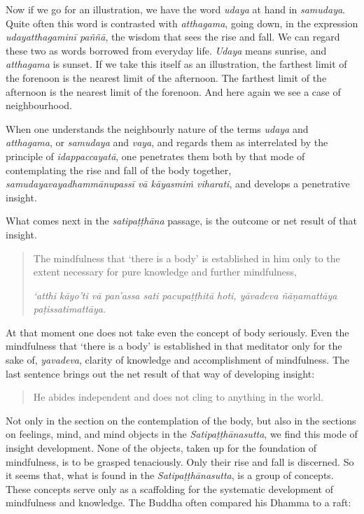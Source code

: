 Now if we go for an illustration, we have the word \emph{udaya} at hand in \emph{samudaya}. Quite often this word is contrasted with \emph{atthagama}, going down, in the expression \emph{udayatthagaminī paññā}, the wisdom that sees the rise and fall. We can regard these two as words borrowed from everyday life. \emph{Udaya} means sunrise, and \emph{atthagama} is sunset. If we take this itself as an illustration, the farthest limit of the forenoon is the nearest limit of the afternoon. The farthest limit of the afternoon is the nearest limit of the forenoon. And here again we see a case of neighbourhood.

When one understands the neighbourly nature of the terms \emph{udaya} and \emph{atthagama}, or \emph{samudaya} and \emph{vaya}, and regards them as interrelated by the principle of \emph{idappaccayatā}, one penetrates them both by that mode of contemplating the rise and fall of the body together, \emph{samudayavayadhammānupassī vā kāyasmiṁ viharati}, and develops a penetrative insight.

What comes next in the \emph{satipaṭṭhāna} passage, is the outcome or net result of that insight.

\begin{quote}
The mindfulness that `there is a body' is established in him only to the extent necessary for pure knowledge and further mindfulness,

\emph{`atthi kāyo'ti vā pan'assa sati pacupaṭṭhitā hoti, yāvadeva ñāṇamattāya paṭissatimattāya}.
\end{quote}

At that moment one does not take even the concept of body seriously. Even the mindfulness that `there is a body' is established in that meditator only for the sake of, \emph{yavadeva}, clarity of knowledge and accomplishment of mindfulness. The last sentence brings out the net result of that way of developing insight:

\begin{quote}
He abides independent and does not cling to anything in the world.
\end{quote}

Not only in the section on the contemplation of the body, but also in the sections on feelings, mind, and mind objects in the \emph{Satipaṭṭhānasutta}, we find this mode of insight development. None of the objects, taken up for the foundation of mindfulness, is to be grasped tenaciously. Only their rise and fall is discerned. So it seems that, what is found in the \emph{Satipaṭṭhānasutta}, is a group of concepts. These concepts serve only as a scaffolding for the systematic development of mindfulness and knowledge. The Buddha often compared his Dhamma to a raft:

